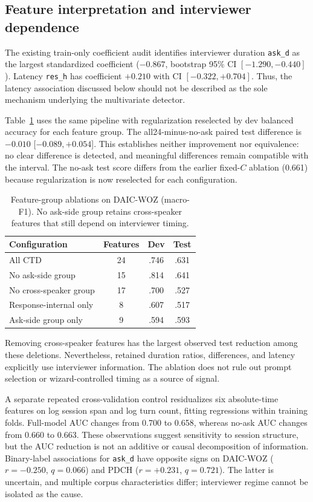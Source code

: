 \documentclass{article}
\begin{document}
\subsection{Feature interpretation and interviewer dependence}
\label{sec:audit-cross}
The existing train-only coefficient audit identifies interviewer duration \texttt{ask\_d} as the largest standardized coefficient ($-0.867$, bootstrap 95\% CI $[-1.290,-0.440]$). Latency \texttt{res\_h} has coefficient $+0.210$ with CI $[-0.322,+0.704]$. Thus, the latency association discussed below should not be described as the sole mechanism underlying the multivariate detector.

Table~\ref{tab:ablation} uses the same pipeline with regularization reselected by dev balanced accuracy for each feature group. The all24-minus-no-ask paired test difference is $-0.010$ [$-0.089,+0.054$]. This establishes neither improvement nor equivalence: no clear difference is detected, and meaningful differences remain compatible with the interval. The no-ask test score differs from the earlier fixed-$C$ ablation (0.661) because regularization is now reselected for each configuration.

\begin{table}[t]
\centering
\caption{Feature-group ablations on DAIC-WOZ (macro-F1). No ask-side group retains cross-speaker features that still depend on interviewer timing.}
\label{tab:ablation}
\small
\begin{tabular}{lccc}
\toprule
Configuration & Features & Dev & Test\\
\midrule
All CTD & 24 & .746 & .631\\
No ask-side group & 15 & .814 & .641\\
No cross-speaker group & 17 & .700 & .527\\
Response-internal only & 8 & .607 & .517\\
Ask-side group only & 9 & .594 & .593\\
\bottomrule
\end{tabular}
\end{table}

Removing cross-speaker features has the largest observed test reduction among these deletions. Nevertheless, retained duration ratios, differences, and latency explicitly use interviewer information. The ablation does not rule out prompt selection or wizard-controlled timing as a source of signal.

A separate repeated cross-validation control residualizes six absolute-time features on log session span and log turn count, fitting regressions within training folds. Full-model AUC changes from 0.700 to 0.658, whereas no-ask AUC changes from 0.660 to 0.663. These observations suggest sensitivity to session structure, but the AUC reduction is not an additive or causal decomposition of information. Binary-label associations for \texttt{ask\_d} have opposite signs on DAIC-WOZ ($r=-0.250$, $q=0.066$) and PDCH ($r=+0.231$, $q=0.721$). The latter is uncertain, and multiple corpus characteristics differ; interviewer regime cannot be isolated as the cause.
\end{document}
